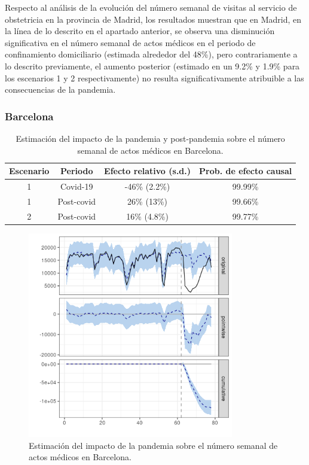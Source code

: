 \documentclass[12pt,twoside]{article} %
\begin{document}
Respecto al análisis de la evolución del número semanal de visitas al servicio de obstetricia en la provincia de Madrid, los resultados muestran que en Madrid, en la línea de lo descrito en el apartado anterior, se observa una disminución significativa en el número semanal de actos médicos en el periodo de confinamiento domiciliario (estimada alrededor del 48\%), pero contrariamente a lo descrito previamente, el aumento posterior (estimado en un 9.2\% y 1.9\% para los escenarios 1 y 2 respectivamente) no resulta significativamente atribuible a las consecuencias de la pandemia.      

\subsubsection{Barcelona}\label{bcn}
\begin{table}[H]\caption{Estimación del impacto de la pandemia y post-pandemia sobre el número semanal de actos médicos en Barcelona.}
    \centering  
    \begin{tabular}{ |c|c|c|c| }
        \hline
        \textbf{Escenario} & \textbf{Periodo} & \textbf{Efecto relativo (s.d.)} & \textbf{Prob. de efecto causal} \\ 
        \hline
     1 & Covid-19 & -46\% (2.2\%) & 99.99\% \\  
     1 & Post-covid & 26\% (13\%) &  99.66\% \\
     \hline   
     2 & Post-covid & 16\% (4.8\%) & 99.77\% \\
     \hline
    \end{tabular}
  \end{table}
  
  \begin{center}
    \begin{figure}[H]
      \includegraphics[width=9cm]{global_covid_Barcelona.png}\caption{Estimación del impacto de la pandemia sobre el número semanal de actos médicos en Barcelona.}
    \end{figure}
    \end{center}
    
\end{document}
